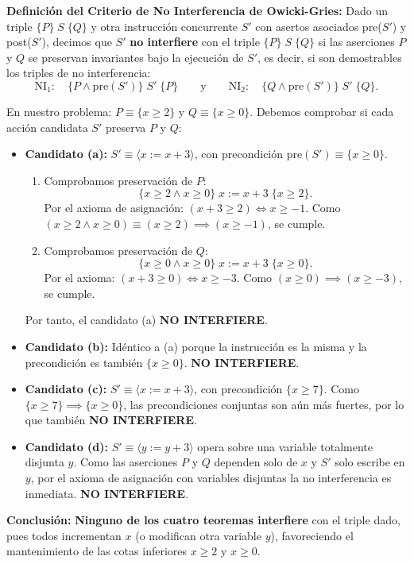 \begin{solucion}
\textbf{Definición del Criterio de No Interferencia de Owicki-Gries:}
Dado un triple $\{P\} \; S \; \{Q\}$ y otra instrucción concurrente $S'$ con asertos asociados pre($S'$) y post($S'$), decimos que $S'$ \textbf{no interfiere} con el triple $\{P\} \; S \; \{Q\}$ si las aserciones $P$ y $Q$ se preservan invariantes bajo la ejecución de $S'$, es decir, si son demostrables los triples de no interferencia:
\[
\text{NI}_1: \quad \{P \land \text{pre}(S')\} \; S' \; \{P\}
\qquad\text{y}\qquad
\text{NI}_2: \quad \{Q \land \text{pre}(S')\} \; S' \; \{Q\}.
\]

En nuestro problema: $P \equiv \{x \ge 2\}$ y $Q \equiv \{x \ge 0\}$. Debemos comprobar si cada acción candidata $S'$ preserva $P$ y $Q$:

\begin{itemize}[leftmargin=*]
    \item \textbf{Candidato (a):} $S' \equiv \langle x := x + 3 \rangle$, con precondición $\text{pre}(S') \equiv \{x \ge 0\}$.
    \begin{enumerate}
        \item Comprobamos preservación de $P$:
        \[
        \{x \ge 2 \land x \ge 0\} \; x := x + 3 \; \{x \ge 2\}.
        \]
        Por el axioma de asignación: $(x + 3 \ge 2) \iff x \ge -1$. Como $(x \ge 2 \land x \ge 0) \equiv (x \ge 2) \implies (x \ge -1)$, se cumple.
        \item Comprobamos preservación de $Q$:
        \[
        \{x \ge 0 \land x \ge 0\} \; x := x + 3 \; \{x \ge 0\}.
        \]
        Por el axioma: $(x + 3 \ge 0) \iff x \ge -3$. Como $(x \ge 0) \implies (x \ge -3)$, se cumple.
    \end{enumerate}
    Por tanto, el candidato (a) \textbf{NO INTERFIERE}.

    \item \textbf{Candidato (b):} Idéntico a (a) porque la instrucción es la misma y la precondición es también $\{x \ge 0\}$. \textbf{NO INTERFIERE}.

    \item \textbf{Candidato (c):} $S' \equiv \langle x := x + 3 \rangle$, con precondición $\{x \ge 7\}$.
    Como $\{x \ge 7\} \implies \{x \ge 0\}$, las precondiciones conjuntas son aún más fuertes, por lo que también \textbf{NO INTERFIERE}.

    \item \textbf{Candidato (d):} $S' \equiv \langle y := y + 3 \rangle$ opera sobre una variable totalmente disjunta $y$.
    Como las aserciones $P$ y $Q$ dependen solo de $x$ y $S'$ solo escribe en $y$, por el axioma de asignación con variables disjuntas la no interferencia es inmediata. \textbf{NO INTERFIERE}.
\end{itemize}

\textbf{Conclusión:} \textbf{Ninguno de los cuatro teoremas interfiere} con el triple dado, pues todos incrementan $x$ (o modifican otra variable $y$), favoreciendo el mantenimiento de las cotas inferiores $x \ge 2$ y $x \ge 0$.
\end{solucion}

